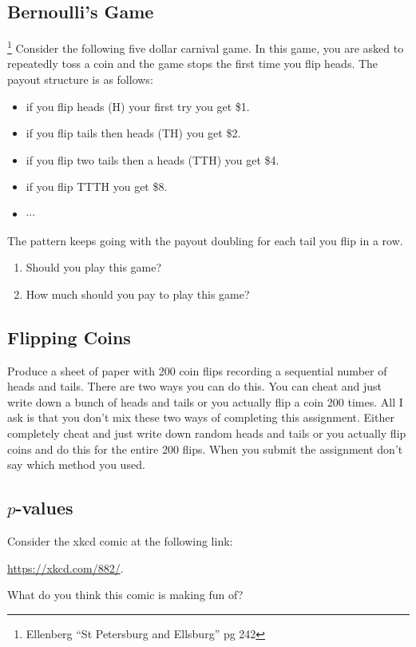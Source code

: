 \documentclass[]{article}
\numberwithin{equation}{section}
\theoremstyle{definition}
\theoremstyle{remark}
\begin{document}
\subsection{Bernoulli's Game}\footnote{Ellenberg ``St Petersburg and Ellsburg'' pg 242}
Consider the following five dollar carnival game. 
In this game, you are asked to repeatedly toss a coin and the game stops the first time you flip heads. 
The payout structure is as follows:
\begin{itemize}
	\item if you flip heads (H) your first try you get \$1. 
	\item if you flip tails then heads (TH) you get \$2.
	\item if you flip two tails then a heads (TTH) you get \$4. 
	\item if you flip TTTH you get \$8.
	\item $\cdots$
\end{itemize}	
The pattern keeps going with the payout doubling for each tail you flip in a row. 
\begin{enumerate}
\item Should you play this game?
\item How much should you pay to play this game?
\end{enumerate}

\subsection{Flipping Coins }
Produce a sheet of paper with 200 coin flips recording a sequential number of heads and tails. There are two ways you can do this. 
You can cheat and just write down a bunch of heads and tails or you actually flip a coin 200 times. 
All I ask is that you don't mix these two ways of completing this assignment.
Either completely cheat and just write down random heads and tails or you actually flip coins and do this for the entire 200 flips.
When you submit the assignment don't say which method you used.

\subsection{$p$-values}	
Consider the xkcd comic at the following link:
\begin{center}
	\url{https://xkcd.com/882/}.
\end{center}
What do you think this comic is making fun of?
\end{document}
